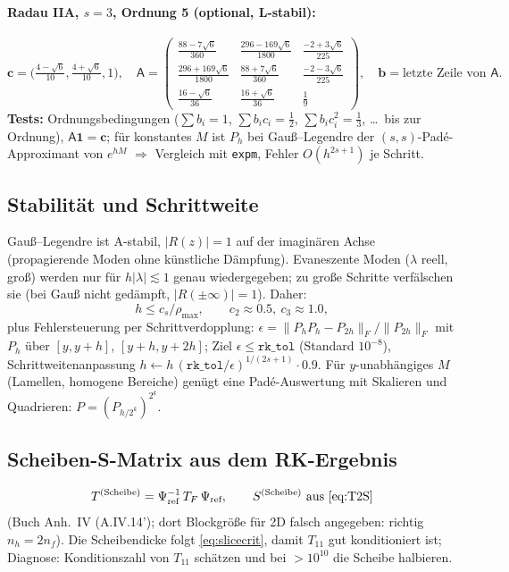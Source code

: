 \paragraph{Radau IIA, $s=3$, Ordnung 5 (optional, L-stabil):}
\[
  \mathbf c=\Big(\tfrac{4-\sqrt6}{10},\tfrac{4+\sqrt6}{10},1\Big),\quad
  \mathsf A=\begin{pmatrix}\tfrac{88-7\sqrt6}{360}&\tfrac{296-169\sqrt6}{1800}&\tfrac{-2+3\sqrt6}{225}\\
  \tfrac{296+169\sqrt6}{1800}&\tfrac{88+7\sqrt6}{360}&\tfrac{-2-3\sqrt6}{225}\\
  \tfrac{16-\sqrt6}{36}&\tfrac{16+\sqrt6}{36}&\tfrac19\end{pmatrix},\quad \mathbf b=\text{letzte Zeile von }\mathsf A .
\]
\textbf{Tests:} Ordnungsbedingungen ($\sum b_i=1$, $\sum b_ic_i=\tfrac12$, $\sum b_ic_i^2=\tfrac13$, \dots\ bis zur
Ordnung), $\mathsf A\mathbf 1=\mathbf c$; für konstantes $M$ ist $P_h$ bei Gauß--Legendre der
$(s,s)$-Padé-Approximant von $e^{hM}$ $\Rightarrow$ Vergleich mit \verb|expm|, Fehler $O(h^{2s+1})$ je Schritt.

\subsection{Stabilität und Schrittweite}
Gauß--Legendre ist A-stabil, $|R(z)|=1$ auf der imaginären Achse (propagierende Moden ohne
künstliche Dämpfung). Evaneszente Moden ($\lambda$ reell, groß) werden nur für $h|\lambda|\lesssim1$ genau
wiedergegeben; zu große Schritte verfälschen sie (bei Gauß nicht gedämpft, $|R(\pm\infty)|=1$).
Daher:
\begin{equation}
  h\le c_s/\rho_{\max},\qquad c_2\approx0.5,\ c_3\approx1.0,
  \label{eq:stepcrit}
\end{equation}
plus Fehlersteuerung per Schrittverdopplung: $\epsilon=\|P_hP_h-P_{2h}\|_F/\|P_{2h}\|_F$ mit
$P_h$ über $[y,y+h]$, $[y+h,y+2h]$; Ziel $\epsilon\le\texttt{rk\_tol}$ (Standard $10^{-8}$),
Schrittweitenanpassung $h\leftarrow h\,(\texttt{rk\_tol}/\epsilon)^{1/(2s+1)}\cdot0.9$.
Für $y$-unabhängiges $M$ (Lamellen, homogene Bereiche) genügt eine Padé-Auswertung mit Skalieren
und Quadrieren: $P=(P_{h/2^k})^{2^k}$.

\subsection{Scheiben-S-Matrix aus dem RK-Ergebnis}
\begin{equation}
  T^{(\text{Scheibe})}=\Psi_{\text{ref}}^{-1}\,T_F\,\Psi_{\text{ref}},\qquad S^{(\text{Scheibe})}\ \text{aus \eqref{eq:T2S}}
  \label{eq:rkslice}
\end{equation}
(Buch Anh.~IV (A.IV.14'); dort Blockgröße für 2D falsch angegeben: richtig $n_h=2n_f$).
Die Scheibendicke folgt \eqref{eq:slicecrit}, damit $T_{11}$ gut konditioniert ist; Diagnose:
Konditionszahl von $T_{11}$ schätzen und bei $>10^{10}$ die Scheibe halbieren.

